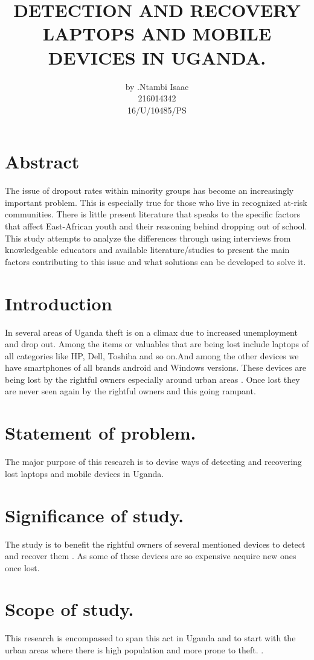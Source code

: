 \documentclass[10pt,letterpaper]{article}
\begin{document}
\title{DETECTION AND RECOVERY LAPTOPS AND MOBILE DEVICES IN UGANDA.}
\author{by .Ntambi Isaac   \\ 216014342 \\  16/U/10485/PS}
\maketitle
\section {Abstract }
The issue of dropout rates within minority groups has become an increasingly important problem. This is especially true for those who live in recognized at-risk communities. There is little present literature that speaks to the specific factors that affect East-African youth and their reasoning behind dropping out of school. This study attempts to analyze the differences through using interviews from knowledgeable educators and available literature/studies to present the main factors contributing to this issue and what solutions can be developed to solve it.
\section{Introduction }
In several areas of Uganda theft is on a climax due to increased unemployment and drop out. Among the items or valuables that are being lost include laptops of all categories like HP, Dell, Toshiba and so on.And among the other devices we have smartphones of all brands android and Windows versions. These devices are being lost by the rightful owners especially around urban areas . Once lost they are never seen again by the rightful owners and this going rampant.

\section{Statement of problem. }
The major purpose of this research is to devise ways of detecting and recovering lost laptops and mobile devices in Uganda.

\section{Significance of study.}
The study is to benefit the rightful owners of several mentioned devices to detect and recover them . As some of these devices are so expensive acquire new ones once lost.
\section{Scope of study.}
This research is encompassed to span this act in Uganda and to start with the urban areas where there is high population and more prone to theft.
.
\end{document}
